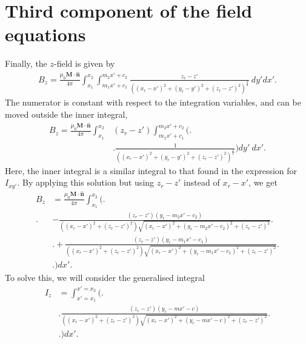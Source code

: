\newpage
\section{Third component of the field equations}
Finally, the \(z\)-field is given by
\begin{align}
    B_z = \frac{\mu_0 \mathbf{M}\cdot\hat{\mathbf{n}}}{4\pi} \int_{x_1}^{x_2} \int_{m_1x'+c_1}^{m_2x'+c_2} \frac{z_r-z'}{\left(\left(x_r-x'\right)^2+\left(y_r-y'\right)^2+\left(z_r-z'\right)^2\right)^\frac{3}{2}}\ dy' dx' \text{.}
\end{align}
The numerator is constant with respect to the integration variables, and can be moved outside the inner integral,
\begin{align}
    B_z = \frac{\mu_0 \mathbf{M}\cdot\hat{\mathbf{n}}}{4\pi} \int_{x_1}^{x_2} &\left(z_r-z'\right) \int_{m_1x'+c_1}^{m_2x'+c_2} \Bigg( \Bigg. \nonumber \\
    &\Bigg. \frac{1}{\left(\left(x_r-x'\right)^2+\left(y_r-y'\right)^2+\left(z_r-z'\right)^2\right)^\frac{3}{2}} \Bigg) dy'\ dx' \text{.}
\end{align}
Here, the inner integral is a similar integral to that found in the expression for \(I_{xy'}\). By applying this solution but using \(z_r-z'\) instead of \(x_r-x'\), we get
\begin{align}
    B_z &= \frac{\mu_0 \mathbf{M}\cdot\hat{\mathbf{n}}}{4\pi} \int_{x_1}^{x_2} \Bigg( \Bigg. \nonumber \\
    \Bigg. & -\frac{\left(z_r-z'\right)\left(y_r-m_2x'-c_2\right)}{\left(\left(x_r-x'\right)^2+\left(z_r-z'\right)^2\right)\sqrt{\left(x_r-x'\right)^2+\left(y_r-m_2x'-c_2\right)^2+\left(z_r-z'\right)^2}} \Bigg. \nonumber \\
    & \Bigg. + \frac{\left(z_r-z'\right)\left(y_r-m_1x'-c_1\right)}{\left(\left(x_r-x'\right)^2+\left(z_r-z'\right)^2\right)\sqrt{\left(x_r-x'\right)^2+\left(y_r-m_1x'-c_1\right)^2+\left(z_r-z'\right)^2}} \Bigg. \nonumber \\
    & \Bigg. \Bigg) dx' \text{.}
\end{align}
To solve this, we will consider the generalised integral
\begin{align}
    I_z &= \int_{x'=x_1}^{x'=x_2} \Bigg( \Bigg. \nonumber \\
    &\Bigg. \frac{\left(z_r-z'\right)\left(y_r-mx'-c\right)}{\left(\left(x_r-x'\right)^2+\left(z_r-z'\right)^2\right)\sqrt{\left(x_r-x'\right)^2+\left(y_r-mx'-c\right)^2+\left(z_r-z'\right)^2}} \Bigg. \nonumber \\
    & \Bigg. \Bigg) dx' \text{.}
\end{align}
